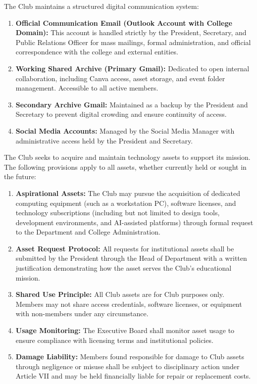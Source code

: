 
The Club maintains a structured digital communication system:
\begin{enumerate}[label=\alph*), leftmargin=2em, itemsep=0.3em]
    \item \textbf{Official Communication Email (Outlook Account with College Domain):} This account is handled strictly by the President, Secretary, and Public Relations Officer for mass mailings, formal administration, and official correspondence with the college and external entities.
    \item \textbf{Working Shared Archive (Primary Gmail):} Dedicated to open internal collaboration, including Canva access, asset storage, and event folder management. Accessible to all active members.
    \item \textbf{Secondary Archive Gmail:} Maintained as a backup by the President and Secretary to prevent digital crowding and ensure continuity of access.
    \item \textbf{Social Media Accounts:} Managed by the Social Media Manager with administrative access held by the President and Secretary.
\end{enumerate}


The Club seeks to acquire and maintain technology assets to support its mission. The following provisions apply to all assets, whether currently held or sought in the future:
\begin{enumerate}[label=\alph*), leftmargin=2em, itemsep=0.3em]
    \item \textbf{Aspirational Assets:} The Club may pursue the acquisition of dedicated computing equipment (such as a workstation PC), software licenses, and technology subscriptions (including but not limited to design tools, development environments, and AI-assisted platforms) through formal request to the Department and College Administration.
    \item \textbf{Asset Request Protocol:} All requests for institutional assets shall be submitted by the President through the Head of Department with a written justification demonstrating how the asset serves the Club's educational mission.
    \item \textbf{Shared Use Principle:} All Club assets are for Club purposes only. Members may not share access credentials, software licenses, or equipment with non-members under any circumstance.
    \item \textbf{Usage Monitoring:} The Executive Board shall monitor asset usage to ensure compliance with licensing terms and institutional policies.
    \item \textbf{Damage Liability:} Members found responsible for damage to Club assets through negligence or misuse shall be subject to disciplinary action under Article VII and may be held financially liable for repair or replacement costs.
\end{enumerate}

